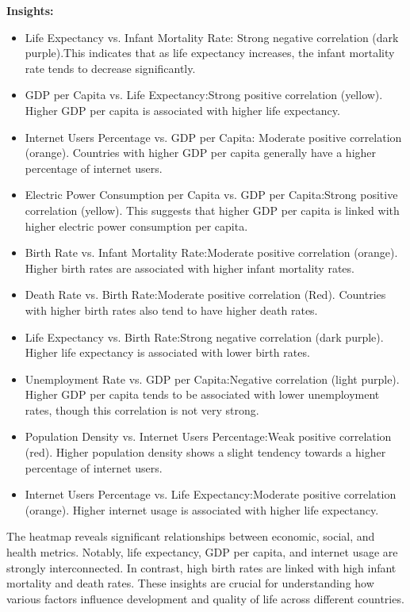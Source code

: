 \documentclass{article}\usepackage[]{graphicx}\usepackage[]{xcolor}
\begin{document}
\textbf{Insights:}
\begin{itemize}
\item{Life Expectancy vs. Infant Mortality Rate: Strong negative correlation (dark purple).This indicates that as life expectancy increases, the infant mortality rate tends to decrease significantly.}

\item{GDP per Capita vs. Life Expectancy:Strong positive correlation (yellow). Higher GDP per capita is associated with higher life expectancy.}

\item{Internet Users Percentage vs. GDP per Capita: Moderate positive correlation (orange). Countries with higher GDP per capita generally have a higher percentage of internet users.}

\item{Electric Power Consumption per Capita vs. GDP per Capita:Strong positive correlation (yellow). This suggests that higher GDP per capita is linked with higher electric power consumption per capita.}

\item{Birth Rate vs. Infant Mortality Rate:Moderate positive correlation (orange). Higher birth rates are associated with higher infant mortality rates.}

\item{Death Rate vs. Birth Rate:Moderate positive correlation (Red). Countries with higher birth rates also tend to have higher death rates.}

\item{Life Expectancy vs. Birth Rate:Strong negative correlation (dark purple). Higher life expectancy is associated with lower birth rates.}

\item{Unemployment Rate vs. GDP per Capita:Negative correlation (light purple). Higher GDP per capita tends to be associated with lower unemployment rates, though this correlation is not very strong.}

\item{Population Density vs. Internet Users Percentage:Weak positive correlation (red). Higher population density shows a slight tendency towards a higher percentage of internet users.}

\item{Internet Users Percentage vs. Life Expectancy:Moderate positive correlation (orange). Higher internet usage is associated with higher life expectancy.}
\end{itemize}
The heatmap reveals significant relationships between economic, social, and health metrics. Notably, life expectancy, GDP per capita, and internet usage are strongly interconnected. In contrast, high birth rates are linked with high infant mortality and death rates. These insights are crucial for understanding how various factors influence development and quality of life across different countries.
\end{document}
